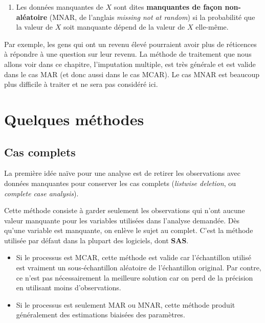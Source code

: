 \documentclass[
  11pt,
  letterpaper,
]{book}
\providecommand{\tightlist}{%
  \setlength{\itemsep}{0pt}\setlength{\parskip}{0pt}}
\theoremstyle{definition}
\theoremstyle{definition}
\theoremstyle{definition}
\theoremstyle{definition}
\theoremstyle{remark}
\begin{document}
\begin{enumerate}
\def\labelenumi{\arabic{enumi})}
\setcounter{enumi}{2}
\tightlist
\item
  Les données manquantes de \(X\) sont dites \textbf{manquantes de façon non-aléatoire} (MNAR, de l'anglais \emph{missing not at random}) si la probabilité que la valeur de \(X\) soit manquante dépend de la valeur de \(X\) elle-même.
\end{enumerate}

Par exemple, les gens qui ont un revenu élevé pourraient avoir plus de réticences à répondre à une question sur leur revenu. La méthode de traitement que nous allons voir dans ce chapitre, l'imputation multiple, est très générale et est valide dans le cas MAR (et donc aussi dans le cas MCAR). Le cas MNAR est beaucoup plus difficile à traiter et ne sera pas considéré ici.

\hypertarget{quelques-muxe9thodes}{%
\section{Quelques méthodes}\label{quelques-muxe9thodes}}

\hypertarget{cas-complets}{%
\subsection{Cas complets}\label{cas-complets}}

La première idée naïve pour une analyse est de retirer les observations avec données manquantes pour conserver les cas complets (\emph{listwise deletion}, ou \emph{complete case analysis}).

Cette méthode consiste à garder seulement les observations qui n'ont aucune valeur manquante pour les variables utilisées dans l'analyse demandée. Dès qu'une variable est manquante, on enlève le sujet au complet. C'est la méthode utilisée par défaut dans la plupart des logiciels, dont \textbf{SAS}.

\begin{itemize}
\tightlist
\item
  Si le processus est MCAR, cette méthode est valide car l'échantillon utilisé est vraiment un sous-échantillon aléatoire de l'échantillon original. Par contre, ce n'est pas nécessairement la meilleure solution car on perd de la précision en utilisant moins d'observations.
\item
  Si le processus est seulement MAR ou MNAR, cette méthode produit généralement des estimations biaisées des paramètres.
\end{itemize}
\end{document}

